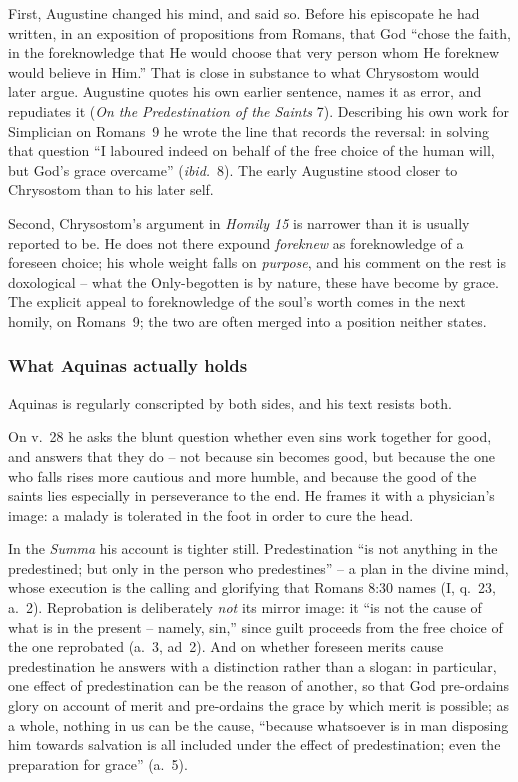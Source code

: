 First, Augustine changed his mind, and said so. Before his episcopate he had written, in an exposition of propositions from Romans, that God ``chose the faith, in the foreknowledge that He would choose that very person whom He foreknew would believe in Him.'' That is close in substance to what Chrysostom would later argue. Augustine quotes his own earlier sentence, names it as error, and repudiates it (\emph{On the Predestination of the Saints} 7). Describing his own work for Simplician on Romans~9 he wrote the line that records the reversal: in solving that question ``I laboured indeed on behalf of the free choice of the human will, but God's grace overcame'' (\emph{ibid.}~8). The early Augustine stood closer to Chrysostom than to his later self.

Second, Chrysostom's argument in \emph{Homily 15} is narrower than it is usually reported to be. He does not there expound \emph{foreknew} as foreknowledge of a foreseen choice; his whole weight falls on \emph{purpose}, and his comment on the rest is doxological -- what the Only-begotten is by nature, these have become by grace. The explicit appeal to foreknowledge of the soul's worth comes in the next homily, on Romans~9; the two are often merged into a position neither states.

\subsubsection*{What Aquinas actually holds}

Aquinas is regularly conscripted by both sides, and his text resists both.

On v.~28 he asks the blunt question whether even sins work together for good, and answers that they do -- not because sin becomes good, but because the one who falls rises more cautious and more humble, and because the good of the saints lies especially in perseverance to the end. He frames it with a physician's image: a malady is tolerated in the foot in order to cure the head.

In the \emph{Summa} his account is tighter still. Predestination ``is not anything in the predestined; but only in the person who predestines'' -- a plan in the divine mind, whose execution is the calling and glorifying that Romans 8:30 names (I, q.~23, a.~2). Reprobation is deliberately \emph{not} its mirror image: it ``is not the cause of what is in the present -- namely, sin,'' since guilt proceeds from the free choice of the one reprobated (a.~3, ad~2). And on whether foreseen merits cause predestination he answers with a distinction rather than a slogan: in particular, one effect of predestination can be the reason of another, so that God pre-ordains glory on account of merit and pre-ordains the grace by which merit is possible; as a whole, nothing in us can be the cause, ``because whatsoever is in man disposing him towards salvation is all included under the effect of predestination; even the preparation for grace'' (a.~5).

